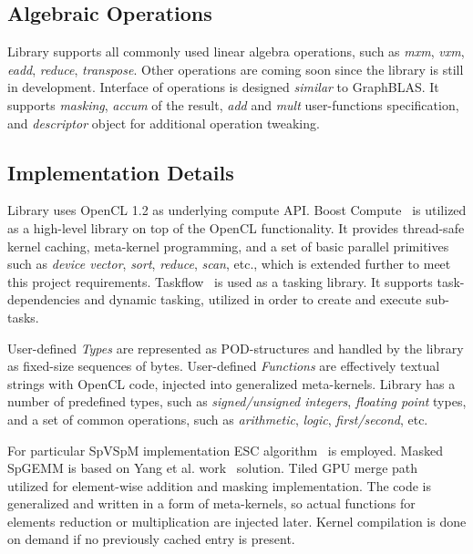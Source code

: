 \subsection{Algebraic Operations}

Library supports all commonly used linear algebra operations, such as \textit{mxm}, \textit{vxm}, \textit{eadd}, \textit{reduce}, \textit{transpose}. 
Other operations are coming soon since the library is still in development.
Interface of operations is designed \textit{similar} to GraphBLAS. 
It supports \textit{masking}, \textit{accum} of the result, \textit{add} and \textit{mult} user-functions specification, and \textit{descriptor} object for additional operation tweaking.

\subsection{Implementation Details}

Library uses OpenCL 1.2 as underlying compute API. 
Boost Compute~\cite{10.1145/2909437.2909454:boost:compute} is utilized as a high-level library on top of the OpenCL functionality. 
It provides thread-safe kernel caching, meta-kernel programming, and a set of basic parallel primitives such as \textit{device vector}, \textit{sort}, \textit{reduce}, \textit{scan}, etc., which is extended further to meet this project requirements.
Taskflow~\cite{Huang2022TaskflowAL} is used as a tasking library. It supports task-dependencies and dynamic tasking, utilized in order to create and execute sub-tasks. 

User-defined \textit{Types} are represented as POD-structures and handled by the library as fixed-size sequences of bytes.
User-defined \textit{Functions} are effectively textual strings with OpenCL code, injected into generalized meta-kernels.
Library has a number of predefined types, such as \textit{signed/unsigned integers}, \textit{floating point} types, and a set of common operations, such as \textit{arithmetic}, \textit{logic}, \textit{first/second}, etc.

For particular SpVSpM implementation ESC algorithm~\cite{10.1145/2699470:esc:algo} is employed. 
Masked SpGEMM is based on Yang et al. work~\cite{yang2019graphblast} solution. 
Tiled GPU merge path~\cite{inproceedings:gpu_merge_path} utilized for element-wise addition and masking implementation.
The code is generalized and written in a form of meta-kernels, so actual functions for elements reduction or multiplication are injected later.
Kernel compilation is done on demand if no previously cached entry is present.
